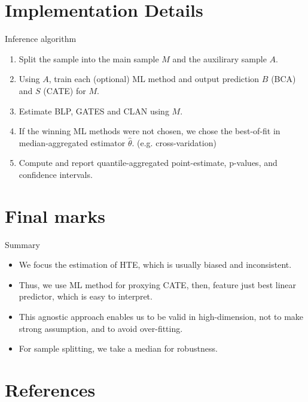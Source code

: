 \documentclass[xcolor=svgnames,aspectratio=169]{beamer}
\begin{document}
\section{Implementation Details}

\begin{frame}{Inference algorithm}
    \begin{enumerate}
        \item Split the sample into the main sample $M$ and the auxilirary sample $A$.
        \item Using $A$, train each (optional) ML method and output prediction $B$ (BCA) and $S$ (CATE) for $M$.
        \item Estimate BLP, GATES and CLAN using $M$.
        \item If the winning ML methods were not chosen, we chose the best-of-fit in median-aggregated estimator $\hat{\theta}$. (e.g. cross-varidation)
        \item Compute and report quantile-aggregated point-estimate, p-values, and confidence intervals.
    \end{enumerate}
\end{frame}

\section{Final marks}

\begin{frame}{Summary}
    \begin{itemize}
        \item We focus the estimation of HTE, which is usually biased and inconsistent.
        \item Thus, we use ML method for proxying CATE, then, feature just best linear predictor, which is easy to interpret.
        \item This agnostic approach enables us to be valid in high-dimension, not to make strong assumption, and to avoid over-fitting.
        \item For sample splitting, we take a median for robustness.
    \end{itemize}
\end{frame}

\section{References}
\end{document}
